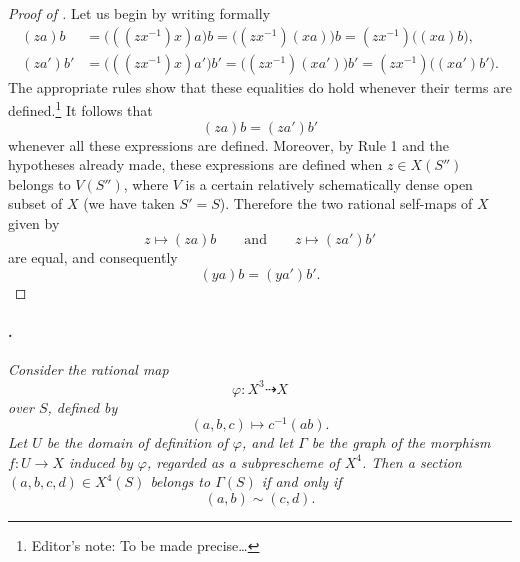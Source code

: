 \begin{proof}[Proof of ]
Let us begin by writing formally
\[
\begin{aligned}
  (za)b
  &=\bigl(((zx^{-1})x)a\bigr)b
   =\bigl((zx^{-1})(xa)\bigr)b
   =(zx^{-1})\bigl((xa)b\bigr),\\
  (za')b'
  &=\bigl(((zx^{-1})x)a'\bigr)b'
   =\bigl((zx^{-1})(xa')\bigr)b'
   =(zx^{-1})\bigl((xa')b'\bigr).
\end{aligned}
\]
The appropriate rules show that these equalities do hold whenever
their terms are defined.\footnote{Editor's note: To be made
precise\ldots} It follows that
\[
  (za)b=(za')b'
\]
whenever all these expressions are defined. Moreover, by Rule 1
and the hypotheses already made, these expressions are defined
when \(z\in X(S'')\) belongs to \(V(S'')\), where \(V\) is a
certain relatively schematically dense open subset of \(X\) (we
have taken \(S'=S\)). Therefore the two rational self-maps of
\(X\) given by
\[
  z\longmapsto(za)b
  \qquad\text{and}\qquad
  z\longmapsto(za')b'
\]
are equal, and consequently
\[
  (ya)b=(ya')b'.
\]
\end{proof}

\paragraph{.}
\textit{Consider the rational map
\[
  \varphi\colon X^3\dashrightarrow X
\]
over \(S\), defined by
\[
  (a,b,c)\longmapsto c^{-1}(ab).
\]
Let \(U\) be the domain of definition of \(\varphi\), and let
\(\Gamma\) be the graph of the morphism \(f\colon U\to X\)
induced by \(\varphi\), regarded as a subprescheme of \(X^4\).
Then a section \((a,b,c,d)\in X^4(S)\) belongs to \(\Gamma(S)\)
if and only if
\[
  (a,b)\sim(c,d).
\]}

